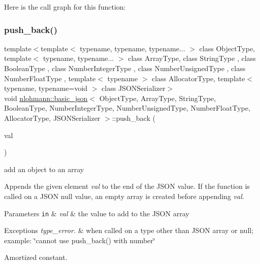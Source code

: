 Here is the call graph for this function\+:
\mbox{\label{classnlohmann_1_1basic__json_ac8e523ddc8c2dd7e5d2daf0d49a9c0d7}} 
\subsubsection{\texorpdfstring{push\+\_\+back()}{push\_back()}\hspace{0.1cm}{\footnotesize\ttfamily [1/4]}}
{\footnotesize\ttfamily template$<$template$<$ typename, typename, typename... $>$ class Object\+Type, template$<$ typename, typename... $>$ class Array\+Type, class String\+Type , class Boolean\+Type , class Number\+Integer\+Type , class Number\+Unsigned\+Type , class Number\+Float\+Type , template$<$ typename $>$ class Allocator\+Type, template$<$ typename, typename=void $>$ class J\+S\+O\+N\+Serializer$>$ \\
void \hyperlink{classnlohmann_1_1basic__json}{nlohmann\+::basic\+\_\+json}$<$ Object\+Type, Array\+Type, String\+Type, Boolean\+Type, Number\+Integer\+Type, Number\+Unsigned\+Type, Number\+Float\+Type, Allocator\+Type, J\+S\+O\+N\+Serializer $>$\+::push\+\_\+back (\begin{DoxyParamCaption}\item[{\hyperlink{classnlohmann_1_1basic__json}{basic\+\_\+json}$<$ Object\+Type, Array\+Type, String\+Type, Boolean\+Type, Number\+Integer\+Type, Number\+Unsigned\+Type, Number\+Float\+Type, Allocator\+Type, J\+S\+O\+N\+Serializer $>$ \&\&}]{val }\end{DoxyParamCaption})\hspace{0.3cm}{\ttfamily [inline]}}



add an object to an array 

Appends the given element {\itshape val} to the end of the J\+S\+ON value. If the function is called on a J\+S\+ON null value, an empty array is created before appending {\itshape val}.


\begin{DoxyParams}[1]{Parameters}
\mbox{\tt in}  & {\em val} & the value to add to the J\+S\+ON array\\
\hline
\end{DoxyParams}

\begin{DoxyExceptions}{Exceptions}
{\em type\+\_\+error.} & when called on a type other than J\+S\+ON array or null; example\+: {\ttfamily \char`\"{}cannot use push\+\_\+back() with number\char`\"{}}\\
\hline
\end{DoxyExceptions}
Amortized constant.

